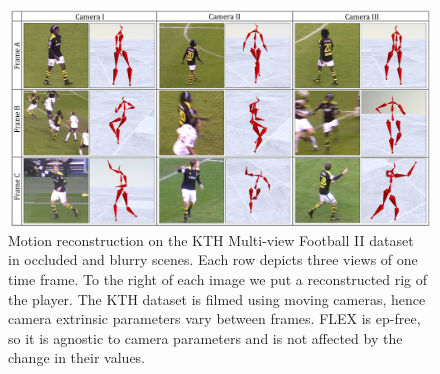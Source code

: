 \begin{figure}
\centering
\includegraphics[width=\linewidth]{./images/football_results.pdf}
\vspace{-17pt}
\caption{Motion reconstruction on the KTH Multi-view Football II dataset~\cite{footballDS} in occluded and blurry scenes. 
Each row depicts three views of one time frame. 
To the right of each image we put a reconstructed rig of the player. %
The KTH dataset is filmed using moving cameras, hence camera extrinsic parameters vary between frames. 
FLEX is ep-free, so it is agnostic to camera parameters and is not affected by the change in their values.
}

\label{fig:football_teaser}
\vspace{-10pt}

\end{figure}

